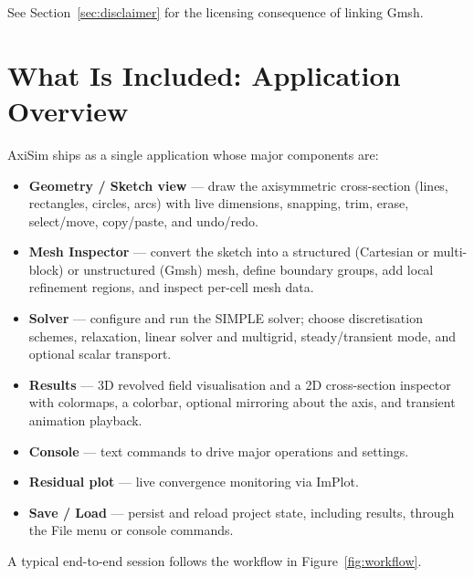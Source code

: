 \documentclass[11pt]{article}
\begin{document}
\noindent See Section~\ref{sec:disclaimer} for the licensing consequence of linking Gmsh.

\section{What Is Included: Application Overview}
AxiSim ships as a single application whose major components are:
\begin{itemize}[nosep]
  \item \textbf{Geometry / Sketch view} --- draw the axisymmetric cross-section
        (lines, rectangles, circles, arcs) with live dimensions, snapping, trim,
        erase, select/move, copy/paste, and undo/redo.
  \item \textbf{Mesh Inspector} --- convert the sketch into a structured (Cartesian
        or multi-block) or unstructured (Gmsh) mesh, define boundary groups, add local
        refinement regions, and inspect per-cell mesh data.
  \item \textbf{Solver} --- configure and run the SIMPLE solver; choose discretisation
        schemes, relaxation, linear solver and multigrid, steady/transient mode, and
        optional scalar transport.
  \item \textbf{Results} --- 3D revolved field visualisation and a 2D cross-section
        inspector with colormaps, a colorbar, optional mirroring about the axis, and
        transient animation playback.
  \item \textbf{Console} --- text commands to drive major operations and settings.
  \item \textbf{Residual plot} --- live convergence monitoring via ImPlot.
  \item \textbf{Save / Load} --- persist and reload project state, including results,
        through the File menu or console commands.
\end{itemize}

A typical end-to-end session follows the workflow in Figure~\ref{fig:workflow}.
\end{document}
